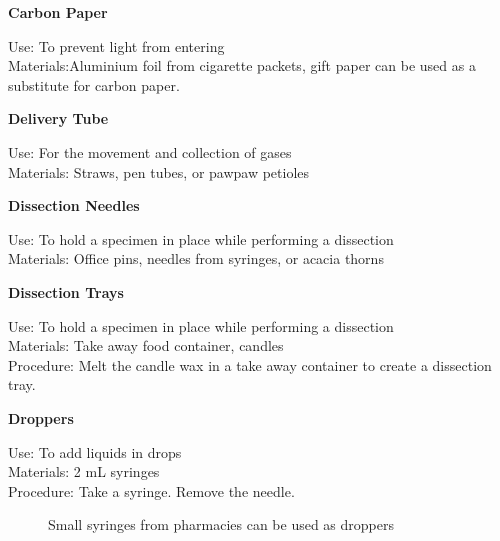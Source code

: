 \begin{flushleft}
\textbf{Carbon Paper}
\end{flushleft}
\vspace{-10pt}
Use: To prevent light from entering\\
Materials:Aluminium foil from cigarette packets, gift paper can be used as a substitute for carbon paper. \\

\begin{flushleft}
\textbf{Delivery Tube}
\end{flushleft}
\vspace{-10pt}
Use: For the movement and collection of gases\\
Materials: Straws, pen tubes, or pawpaw petioles\\

\begin{flushleft}
\textbf{Dissection Needles}
\end{flushleft}
\vspace{-10pt}
Use: To hold a specimen in place while performing a dissection\\
Materials: Office pins, needles from syringes, or acacia thorns\\

\begin{flushleft}
\textbf{Dissection Trays}
\end{flushleft}
\vspace{-10pt}
Use: To hold a specimen in place while performing a dissection\\
Materials: Take away food container, candles\\
Procedure: Melt the candle wax in a take away container to create a dissection tray.\\

\begin{flushleft}
\textbf{Droppers}
\end{flushleft}
\vspace{-10pt}
Use: To add liquids in drops\\
Materials: 2 mL syringes\\
Procedure: Take a syringe. Remove the needle. \\

\begin{figure}[h]
\begin{center}
\def\svgwidth{3cm}

\caption{Small syringes from pharmacies can be used as droppers}
\label{fig:droppers}
\end{center}
\end{figure}

